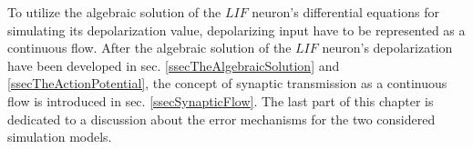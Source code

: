 \documentclass[b5paper,11 pt]{report}
\begin{document}
To utilize the algebraic solution of the $LIF$ neuron's differential equations for simulating its depolarization value, depolarizing input have to be represented as a continuous flow.
After the algebraic solution of the $LIF$ neuron's depolarization have been developed in sec.  \ref{ssecTheAlgebraicSolution} and \ref{ssecTheActionPotential},
	the concept of synaptic transmission as a continuous flow is introduced in sec. \ref{ssecSynapticFlow}.
The last part of this chapter is dedicated to a discussion about the error mechanisms for the two considered simulation models. %

	
	

% 	

\appendix
	
	



%

\end{document}
